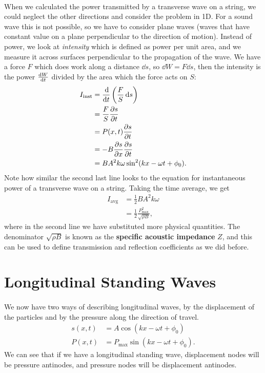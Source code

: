 \documentclass[../classical_mechanics.tex]{subfiles}
\begin{document}
        \paragraph{}
        When we calculated the power transmitted by a transverse wave on a string, we could neglect the other directions and consider the problem in 1D.
        For a sound wave this is not possible, so we have to consider plane waves (waves that have constant value on a plane perpendicular to the direction of motion).
        Instead of power, we look at \textit{intensity} which is defined as power per unit area, and we measure it across surfaces perpendicular to the propagation of the wave.
        We have a force $F$ which does work along a distance $\dd{s}$, so $\dd{W}=F\dd{s}$, then the intensity is the power $\dv{W}{t}$ divided by the area which the force acts on $S$:
        \begin{align}
            I_\text{inst}&=\dv{}{t}\left(\frac{F}{S}\dd{s}\right)\\
            &=\frac{F}{S}\pdv{s}{t}\\
            &=P(x,t)\pdv{s}{t}\\
            &=-B\pdv{s}{x}\pdv{s}{t}\\
            &=BA^2k\omega\sin^2(kx-\omega t+\phi_0).
        \end{align}
        Note how similar the second last line looks to the equation for instantaneous power of a transverse wave on a string.
        Taking the time average, we get
        \begin{align}
            I_\text{avg}&=\frac{1}{2}BA^2k\omega\\
            &=\frac{1}{2}\frac{P_\text{max}^2}{\sqrt{\rho B}},
        \end{align}
        where in the second line we have substituted more physical quantities.
        The denominator $\sqrt{\rho B}$ is known as the \textbf{specific acoustic impedance} $Z$, and this can be used to define transmission and reflection coefficients as we did before.

    \section{Longitudinal Standing Waves}\label{sec:longitudinal-standing-waves}
        \paragraph{}
        We now have two ways of describing longitudinal waves, by the displacement of the particles and by the pressure along the direction of travel.
        \begin{align}
            s(x,t)&=A\cos(kx-\omega t+\phi_0)\\
            P(x,t)&=P_\text{max}\sin(kx-\omega t+\phi_0).
        \end{align}
        We can see that if we have a longitudinal standing wave, displacement nodes will be pressure antinodes, and pressure nodes will be displacement antinodes.
\end{document}
